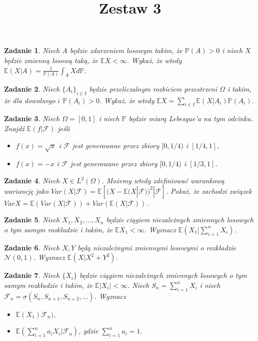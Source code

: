\documentclass{mwart}
\title{Zestaw 3}
\newtheorem{zd}{Zadanie}
\begin{document}

\maketitle

\begin{zd}
Niech $A$ będzie zdarzeniem losowym takim, że $\mathbb{P}(A) > 0$ i niech $X$ będzie zmienną losową taką, że $\mathbb{E}X < \infty$. Wykaż, że wtedy $\mathbb{E}(X|A) = \frac{1}{\mathbb{P}(A)}\int_AXd\mathbb{P}$.
\end{zd}

\begin{zd}
Niech $\{A_i\}_{i \in I}$ będzie przeliczalnym rozbiciem przestrzeni $\Omega$ i takim, że dla dowolnego $i$ $\mathbb{P}(A_i) > 0$. Wykaż, że wtedy $\mathbb{E}X = \sum_{i\in I}\mathbb{E}(X|A_i)\mathbb{P}(A_i)$.
\end{zd}

\begin{zd}
Niech $\Omega = [0, 1]$ i niech $\mathbb{P}$ będzie miarą Lebesgue'a na tym odcinku. Znajdź $\mathbb{E}(f|\mathcal{F})$ jeśli
\begin{itemize}
\item $f(x) = \sqrt{x}$ i $\mathcal{F}$ jest generowane przez zbiory $[0, 1/4)$ i $[1/4, 1]$,
\item $f(x) = -x$ i $\mathcal{F}$ jest generowane przez zbiory $[0, 1/4)$ i $[1/3, 1]$.
\end{itemize}
\end{zd}

\begin{zd}
Niech $X\in L^2(\Omega)$. Możemy wtedy zdefiniować warunkową wariancję jako $Var(X|\mathcal{F}) = \mathbb{E}\left[(X - \mathbb{E}(X|\mathcal{F}))^2|\mathcal{F}\right]$. Pokaż, że zachodzi związek $VarX = \mathbb{E}\left(Var(X|\mathcal{F})\right) + Var\left(\mathbb{E}(X|\mathcal{F})\right)$.
\end{zd}

\begin{zd}
Niech $X_1, X_2, \dots, X_n$ będzie ciągiem niezależnych zmiennych losowych o tym samym rozkładzie i takim, że $\mathbb{E}X_1 < \infty$. Wyznacz $\mathbb{E}(X_1|\sum_{i=1}^nX_i)$.
\end{zd}

\begin{zd}
Niech $X, Y$ będą niezależnymi zmiennymi losowymi o rozkładzie $\mathcal{N}(0, 1)$. Wyznacz $\mathbb{E}(X|X^2+Y^2)$.
\end{zd}

\begin{zd}
Niech $\{X_i\}$ będzie ciągiem niezależnych zmiennych losowych o tym samym rozkładzie i takim, że $\mathbb{E}|X_i|<\infty$. Niech $S_n = \sum_{i=1}^nX_i$ i niech $\mathcal{F}_n = \sigma\left(S_n, S_{n+1}, S_{n+2}, \dots\right)$. Wyznacz
\begin{itemize}
\item $\mathbb{E}(X_1)\mathcal{F}_n)$,
\item $\mathbb{E}\left(\sum_{i=1}^na_iX_i|\mathcal{F}_n\right)$, gdzie $\sum_{i=1}^na_i = 1$.
\end{itemize}
\end{zd}
\end{document}
